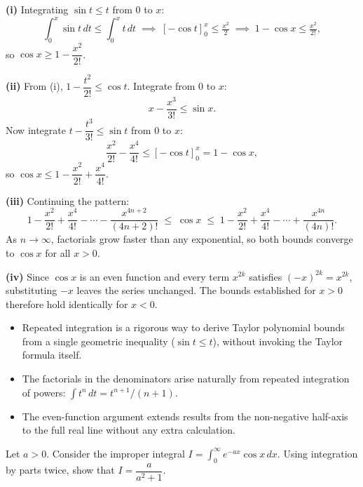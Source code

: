 \begin{solution}
\textbf{(i)} Integrating $\sin t \le t$ from $0$ to $x$:
\[
\int_0^x \sin t\,dt \le \int_0^x t\,dt
\;\implies\; [-\cos t]_0^x \le \tfrac{x^2}{2}
\;\implies\; 1-\cos x \le \tfrac{x^2}{2!},
\]
so $\cos x \ge 1 - \dfrac{x^2}{2!}$.

\textbf{(ii)} From (i), $1 - \dfrac{t^2}{2!} \le \cos t$.  Integrate from $0$ to $x$:
\[
x - \frac{x^3}{3!} \le \sin x.
\]
Now integrate $t - \dfrac{t^3}{3!} \le \sin t$ from $0$ to $x$:
\[
\frac{x^2}{2!} - \frac{x^4}{4!} \le [-\cos t]_0^x = 1-\cos x,
\]
so $\cos x \le 1 - \dfrac{x^2}{2!} + \dfrac{x^4}{4!}$.

\textbf{(iii)} Continuing the pattern:
\[
1-\frac{x^2}{2!}+\frac{x^4}{4!}-\cdots-\frac{x^{4n+2}}{(4n+2)!}
\;\le\; \cos x \;\le\;
1-\frac{x^2}{2!}+\frac{x^4}{4!}-\cdots+\frac{x^{4n}}{(4n)!}.
\]
As $n\to\infty$, factorials grow faster than any exponential, so both bounds converge to
$\cos x$ for all $x > 0$.

\textbf{(iv)} Since $\cos x$ is an even function and every term $x^{2k}$ satisfies
$(-x)^{2k} = x^{2k}$, substituting $-x$ leaves the series unchanged.  The bounds established
for $x > 0$ therefore hold identically for $x < 0$.
\end{solution}

\begin{takeaways}
\begin{itemize}[leftmargin=*]
  \item Repeated integration is a rigorous way to derive Taylor polynomial bounds from a single
        geometric inequality ($\sin t \le t$), without invoking the Taylor formula itself.
  \item The factorials in the denominators arise naturally from repeated integration of powers:
        $\int t^n\,dt = t^{n+1}/(n+1)$.
  \item The even-function argument extends results from the non-negative half-axis to the full
        real line without any extra calculation.
\end{itemize}
\end{takeaways}

\begin{problem}

Let $a > 0$.  Consider the improper integral $\displaystyle I = \int_0^\infty e^{-ax}\cos x\,dx$.
Using integration by parts twice, show that $I = \dfrac{a}{a^2+1}$.
\end{problem}

